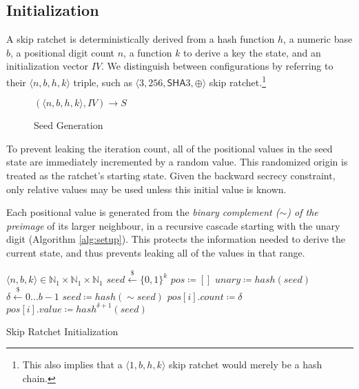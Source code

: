 \documentclass[twocolumn]{article}
\begin{document}
	\subsection{Initialization}
	
	A skip ratchet is deterministically derived from a hash function $h$, a numeric base $b$, a positional digit count $n$, a function $k$ to derive a key the state, and an initialization vector $IV$. We distinguish between configurations by referring to their $\langle n, b, h, k \rangle$ triple, such as $\langle 3, 256, \textsf{SHA}3, \oplus \rangle$ skip ratchet.\footnote{This also implies that a $\langle 1, b, h, k \rangle$ skip ratchet would merely be a hash chain.}

	\begin{figure}[h]
		\centering
	
		$(\langle n, b, h, k \rangle, IV) \rightarrow S$
	
		\caption{Seed Generation}
		\label{fig:config}
	\end{figure}
	
	To prevent leaking the iteration count, all of the positional values in the seed state are immediately incremented by a random value. This randomized origin is treated as the ratchet's starting state. Given the backward secrecy constraint, only relative values may be used unless this initial value is known.
	
	Each positional value is generated from the \emph{binary complement ($\sim$) of the preimage} of its larger neighbour, in a recursive cascade starting with the unary digit (Algorithm \ref{alg:setup}). This protects the information needed to derive the current state, and thus prevents leaking all of the values in that range.
		
	\begin{algorithm*}
		\begin{algorithmic}[1]
			\Require $\langle n, b, k \rangle \in \mathbb{N}_{1}\times{\mathbb{N}_{1}\times{\mathbb{N}_{1}}}$
			\State $seed \overset{\$}{\gets} \lbrace 0, 1 \rbrace^{k}$
			\State $pos   \coloneqq []$
			\State $unary \coloneqq hash(seed)$
			 
				\State $\delta \overset{\$}{\gets} 0\ldots{b - 1}$
				\State $seed \coloneqq hash(\sim{seed})$ 
				\State $pos[i].count \coloneqq \delta$
				\State $pos[i].value \coloneqq hash^{\delta + 1}(seed)$
			\EndFor
			\\
		\end{algorithmic}
	
		\caption{Skip Ratchet Initialization}
		\label{alg:setup}
	\end{algorithm*}
\end{document}
